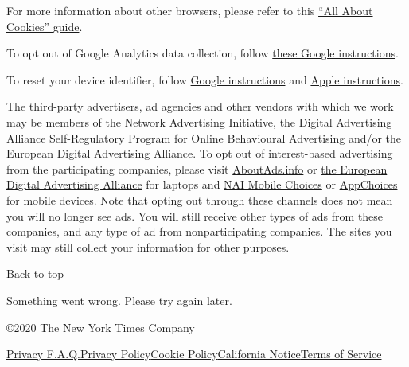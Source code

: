 For more information about other browsers, please refer to this
\href{https://www.allaboutcookies.org/manage-cookies/}{``All About
Cookies'' guide}.

To opt out of Google Analytics data collection, follow
\href{https://tools.google.com/dlpage/gaoptout}{these Google
instructions}.

To reset your device identifier, follow
\href{https://support.google.com/googleplay/android-developer/answer/6048248?hl=en}{Google
instructions} and \href{https://support.apple.com/en-us/HT205223}{Apple
instructions}.

The third-party advertisers, ad agencies and other vendors with which we
work may be members of the Network Advertising Initiative, the Digital
Advertising Alliance Self-Regulatory Program for Online Behavioural
Advertising and/or the European Digital Advertising Alliance. To opt out
of interest-based advertising from the participating companies, please
visit \href{http://optout.aboutads.info/?c=2\&lang=EN}{AboutAds.info} or
\href{http://www.youronlinechoices.eu/}{the European Digital Advertising
Alliance} for laptops and
\href{https://www.networkadvertising.org/mobile-choice/}{NAI Mobile
Choices} or \href{https://youradchoices.com/appchoices}{AppChoices} for
mobile devices. Note that opting out through these channels does not
mean you will no longer see ads. You will still receive other types of
ads from these companies, and any type of ad from nonparticipating
companies. The sites you visit may still collect your information for
other purposes.

\href{app}{Back to top}

Something went wrong. Please try again later.

©2020 The New York Times Company

\href{/privacy}{Privacy F.A.Q.}\href{/privacy/privacy-policy}{Privacy
Policy}\href{/privacy/cookie-policy}{Cookie
Policy}\href{/privacy/california-notice}{California
Notice}\href{https://help.nytimes.com/hc/en-us/articles/115014893428-Terms-of-service}{Terms
of Service}
